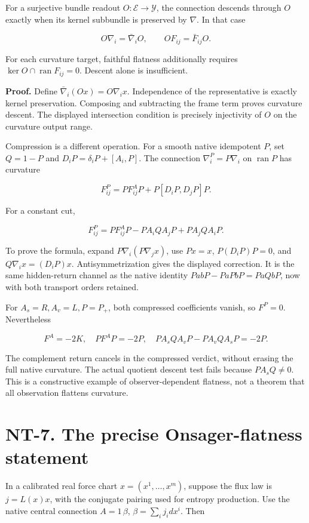 \documentclass[
  11pt,
]{article}
\begin{document}
For a surjective bundle readout \(O:\mathcal E\to\mathcal Y\), the
connection descends through \(O\) exactly when its kernel subbundle is
preserved by \(\nabla\). In that case

\[
O\nabla_i=\bar\nabla_i O,\qquad OF_{ij}=\bar F_{ij}O.
\]

For each curvature target, faithful flatness additionally requires
\(\ker O\cap\operatorname{ran}F_{ij}=0\). Descent alone is insufficient.

\textbf{Proof.} Define \(\bar\nabla_i(Ox)=O\nabla_i x\). Independence of
the representative is exactly kernel preservation. Composing and
subtracting the frame term proves curvature descent. The displayed
intersection condition is precisely injectivity of \(O\) on the
curvature output range.

Compression is a different operation. For a smooth native idempotent
\(P\), set \(Q=1-P\) and \(D_iP=\delta_iP+[A_i,P]\). The connection
\(\nabla_i^P=P\nabla_i\) on \(\operatorname{ran}P\) has curvature

\[
\boxed{F^P_{ij}=PF^A_{ij}P+P[D_iP,D_jP]P.}
\]

For a constant cut,

\[
F^P_{ij}=PF^A_{ij}P
 -PA_iQA_jP+PA_jQA_iP.
\]

To prove the formula, expand \(P\nabla_i(P\nabla_jx)\), use \(Px=x\),
\(P(D_iP)P=0\), and \(Q\nabla_i x=(D_iP)x\). Antisymmetrization gives
the displayed correction. It is the same hidden-return channel as the
native identity \(PabP-PaPbP=PaQbP\), now with both transport orders
retained.

For \(A_s=R,A_v=L,P=P_+\), both compressed coefficients vanish, so
\(F^P=0\). Nevertheless

\[
F^A=-2K,\quad PF^AP=-2P,\quad
PA_sQA_vP-PA_vQA_sP=-2P.
\]

The complement return cancels in the compressed verdict, without erasing
the full native curvature. The actual quotient descent test fails
because \(PA_sQ\ne0\). This is a constructive example of
observer-dependent flatness, not a theorem that all observation flattens
curvature.

\hypertarget{nt-7.-the-precise-onsager-flatness-statement}{%
\section{NT-7. The precise Onsager-flatness
statement}\label{nt-7.-the-precise-onsager-flatness-statement}}

In a calibrated real force chart \(x=(x^1,\ldots,x^m)\), suppose the
flux law is \(j=L(x)x\), with the conjugate pairing used for entropy
production. Use the native central connection \(A=1\,\beta\),
\(\beta=\sum_i j_i dx^i\). Then
\end{document}
